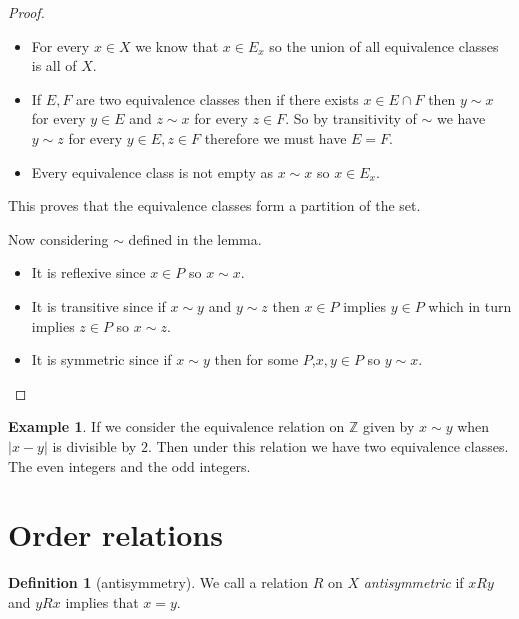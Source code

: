 \documentclass[
]{book}
\theoremstyle{definition}
\newtheorem{definition}{Definition}[chapter]
\theoremstyle{definition}
\newtheorem{example}{Example}[chapter]
\theoremstyle{definition}
\theoremstyle{definition}
\theoremstyle{remark}
\begin{document}
\begin{proof}

\begin{itemize}
\item
  For every \(x \in X\) we know that \(x \in E_x\) so the union of all equivalence classes is all of \(X\).
\item
  If \(E, F\) are two equivalence classes then if there exists \(x \in E \cap F\) then \(y \sim x\) for every \(y \in E\) and \(z \sim x\) for every \(z \in F\). So by transitivity of \(\sim\) we have \(y \sim z\) for every \(y \in E, z \in F\) therefore we must have \(E=F\).
\item
  Every equivalence class is not empty as \(x \sim x\) so \(x \in E_x\).
\end{itemize}

This proves that the equivalence classes form a partition of the set.

Now considering \(\sim\) defined in the lemma.

\begin{itemize}
\item
  It is reflexive since \(x \in P\) so \(x \sim x\).
\item
  It is transitive since if \(x \sim y\) and \(y \sim z\) then \(x \in P\) implies \(y \in P\) which in turn implies \(z \in P\) so \(x \sim z\).
\item
  It is symmetric since if \(x \sim y\) then for some \(P\),\(x, y \in P\) so \(y \sim x\).
\end{itemize}

\end{proof}

\begin{example}
If we consider the equivalence relation on \(\mathbb{Z}\) given by \(x \sim y\) when \(|x-y|\) is divisible by \(2\). Then under this relation we have two equivalence classes. The even integers and the odd integers.
\end{example}

\section{Order relations}\label{order-relations}

\begin{definition}[antisymmetry]
We call a relation \(R\) on \(X\) \emph{antisymmetric} if \(x R y\) and \(y R x\) implies that \(x=y\).
\end{definition}
\end{document}
